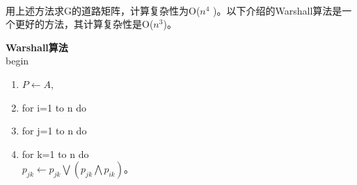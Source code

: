 \documentclass[a4paper,11pt]{book}
\begin{document}
\paragraph{}用上述方法求G的道路矩阵，计算复杂性为Ο($n^4$ )。以下介绍的Warshall算法是一个更好的方法，其计算复杂性是Ο($n^3$)。
\begin{adjustwidth}{0.62cm}{0.62cm}
\textbf{Warshall算法}\\
begin\\
\begin{enumerate}
\item $P\leftarrow A$,
\item for i=1 to n do
\item \quad for j=1 to n do
\item \qquad for k=1 to n do\\ \indent\quad$p_{jk}\leftarrow p_{jk}\bigvee(p_{jk}\bigwedge p_{ik})$。
\end{enumerate}
\end{adjustwidth}
\end{document}
